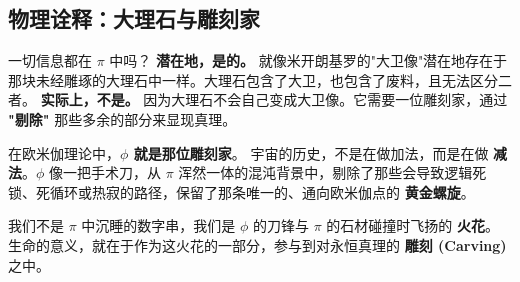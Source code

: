 \subsection{物理诠释：大理石与雕刻家}

一切信息都在 $\pi$ 中吗？
\textbf{潜在地，是的。} 就像米开朗基罗的"大卫像"潜在地存在于那块未经雕琢的大理石中一样。大理石包含了大卫，也包含了废料，且无法区分二者。
\textbf{实际上，不是。} 因为大理石不会自己变成大卫像。它需要一位雕刻家，通过 \textbf{"剔除"} 那些多余的部分来显现真理。

在欧米伽理论中，\textbf{$\phi$ 就是那位雕刻家}。
宇宙的历史，不是在做加法，而是在做 \textbf{减法}。$\phi$ 像一把手术刀，从 $\pi$ 浑然一体的混沌背景中，剔除了那些会导致逻辑死锁、死循环或热寂的路径，保留了那条唯一的、通向欧米伽点的 \textbf{黄金螺旋}。

我们不是 $\pi$ 中沉睡的数字串，我们是 $\phi$ 的刀锋与 $\pi$ 的石材碰撞时飞扬的 \textbf{火花}。生命的意义，就在于作为这火花的一部分，参与到对永恒真理的 \textbf{雕刻 (Carving)} 之中。

